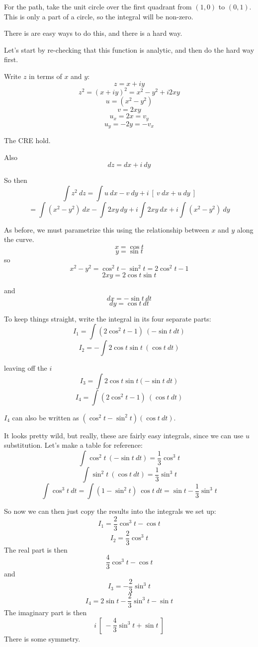 \documentclass[11pt, oneside]{article}
\begin{document}
For the path, take the unit circle over the first quadrant from $(1,0)$ to $(0,1)$.  This is only a part of a circle, so the integral will be non-zero. 

There is are easy ways to do this, and there is a hard way.  

Let's start by re-checking that this function is analytic, and then do the hard way first.

Write $z$ in terms of $x$ and $y$:
\[ z = x + iy \]
\[ z^2 = (x + iy)^2 = x^2 - y^2 + i2xy \]
\[ u = (x^2 - y^2) \]
\[ v = 2xy \]
\[ u_x = 2x = v_y \]
\[ u_y = -2y = -v_x \]

The CRE hold.

Also
\[ dz = dx + i \ dy \]

So then
\[ \int z^2 \ dz = \int u \ dx - v \ dy + i \ [ \ v \ dx + u \ dy \ ] \]
\[ = \int (x^2 - y^2) \ dx - \int 2 xy \ dy + i \int 2xy \ dx + i \int (x^2-y^2) \ dy \]

As before, we must parametrize this using the relationship between $x$ and $y$ along the curve.
\[ x = \cos t \]
\[ y = \sin t \]
so
\[ x^2 - y^2 = \cos^2 t - \sin^2 t = 2 \cos^2 t - 1  \]
\[ 2xy = 2 \cos t \sin t  \]

and
\[ dx = - \sin t \ dt \]
\[ dy = \cos t \ dt \]

To keep things straight, write the integral in its four separate parts:
\[ I_1 = \int (2 \cos^2 t - 1) \  (- \sin t \ dt) \]
\[ I_2 = - \int 2 \cos t \sin t \ (\cos t \ dt) \]

leaving off the $i$
\[ I_3 = \int 2 \cos t \sin t (- \sin t \ dt) \]
\[ I_4 = \int (2 \cos^2 t - 1) \ (\cos t \ dt) \]

$I_4$ can also be written as $(\cos^2 t - \sin^2 t)(\cos t \ dt)$.

It looks pretty wild, but really, these are fairly easy integrals, since we can use $u$ substitution.  Let's make a table for reference:
\[ \int \cos^2 t \ (- \sin t \ dt) = \frac{1}{3} \cos^3 t \]
\[ \int \sin^2 t \ (\cos t \ dt) = \frac{1}{3} \sin^3 t \]
\[ \int \cos^3 t \ dt = \int (1 - \sin^2 t) \ \cos t \ dt = \sin t - \frac{1}{3} \sin^3 t \]

So now we can then just copy the results into the integrals we set up:
\[ I_1 = \frac{2}{3} \cos^3 t - \cos t \]
\[  I_2 = \frac{2}{3} \cos^3 t \]
The real part is then
\[  \frac{4}{3} \cos^3 t - \cos t \]
and
\[ I_3 = -\frac{2}{3} \sin^3 t \]
\[  I_4  = 2 \sin t - \frac{2}{3} \sin^3 t - \sin t \]
The imaginary part is then
\[ i \ [ \ -\frac{4}{3} \sin^3 t + \sin t \ ] \]
There is some symmetry.
\end{document}
